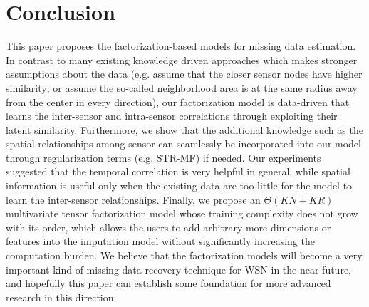 \section{Conclusion}  \label{sec:conc}
This paper proposes the factorization-based models for missing data estimation. In contrast to many existing knowledge driven approaches which makes stronger assumptions about the data (e.g. assume that the closer sensor nodes have higher similarity; or assume the so-called neighborhood area is at the same radius away from the center in every direction), our factorization model is data-driven that learns the inter-sensor and intra-sensor correlations through exploiting their latent similarity. Furthermore, we show that the additional knowledge such as the spatial relationships among sensor can seamlessly be incorporated into our model through regularization terms (e.g. STR-MF) if needed. Our experiments suggested that the temporal correlation is very helpful in general, while spatial information is useful only when the existing data are too little for the model to learn the inter-sensor relationships. Finally, we propose an $\Theta(KN + KR)$ multivariate tensor factorization model whose training complexity does not grow with its order, which allows the users to add arbitrary more dimensions or features into the imputation model without significantly increasing the computation burden.
We believe that the factorization models will become a very important kind of missing data recovery technique for WSN in the near future, and hopefully this paper can establish some foundation for more advanced research in this direction. 
